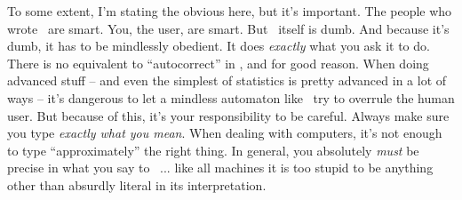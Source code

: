To some extent, I'm stating the obvious here, but it's important. The people who wrote \R\ are smart. You, the user, are smart. But \R\ itself is dumb. And because it's dumb, it has to be mindlessly obedient. It does {\it exactly} what you ask it to do. There is  no equivalent to ``autocorrect'' in \R, and for good reason. When doing advanced stuff -- and even the simplest of statistics is pretty advanced in a lot of ways -- it's dangerous to let a mindless automaton like \R\ try to overrule the human user. But because of this, it's your responsibility to be careful. Always make sure you type {\it exactly what you mean}. When dealing with computers, it's not enough to type ``approximately'' the right thing. In general, you absolutely {\it must} be precise in what you say to \R\ ... like all machines it is too stupid to be anything other than absurdly literal in its interpretation.


